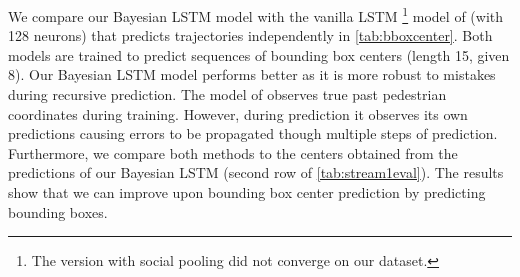  We compare our Bayesian LSTM model with the vanilla LSTM \footnote{The version with social pooling did not converge on our dataset.} model of \cite{alahi2016social} (with 128 neurons) that predicts trajectories independently in \autoref{tab:bboxcenter}. Both models are trained to predict sequences of bounding box centers (length 15, given 8). Our Bayesian LSTM model performs better as it is more robust to mistakes during recursive prediction. The model of \cite{alahi2016social} observes true past pedestrian coordinates during training. However, during prediction it observes its own predictions causing errors to be propagated though multiple steps of prediction. Furthermore, we compare both methods to the centers obtained from the predictions of our Bayesian LSTM (second row of \autoref{tab:stream1eval}). The results show that we can improve upon bounding box center prediction by predicting bounding boxes.


\begin{table}[!t]
\centering
{}
\caption{Odometry prediction error (MSE), $| \text{O}_{\text{p}}| = \left\{8\right\}$.}
\label{fig:stream2eval}
\end{table}

